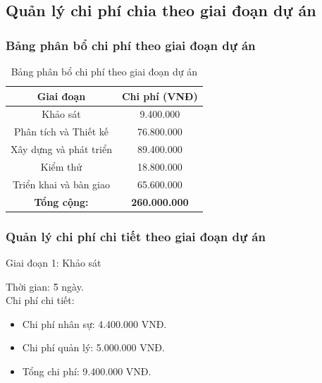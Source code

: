 \subsection{Quản lý chi phí chia theo giai đoạn dự án}
\subsubsection{Bảng phân bổ chi phí theo giai đoạn dự án}
\begin{table}[H]
    \centering
    \renewcommand{\arraystretch}{1.5} %
    \caption{Bảng phân bổ chi phí theo giai đoạn dự án}
    \begin{tabular}{|c|c|}
        \hline
        \textbf{Giai đoạn}                        & \textbf{Chi phí (VNĐ)} \\
        \hline
        Khảo sát                                  & 9.400.000              \\
        \hline
        Phân tích và Thiết kế                     & 76.800.000             \\
        \hline
        Xây dựng và phát triển                    & 89.400.000             \\
        \hline
        Kiểm thử                                  & 18.800.000             \\
        \hline
        Triển khai và bàn giao                    & 65.600.000             \\
        \hline
        \multicolumn{1}{|c|}{\textbf{Tổng cộng:}} & \textbf{260.000.000}   \\
        \hline
    \end{tabular}
\end{table}


\subsubsection{Quản lý chi phí chi tiết theo giai đoạn dự án}
\noindent Giai đoạn 1: Khảo sát
\begin{tabbing}
    Thời gian: \= 5 ngày. \\
    Chi phí chi tiết: 
\end{tabbing}
\begin{itemize}
    \item Chi phí nhân sự: 4.400.000 VNĐ.
    \item Chi phí quản lý: 5.000.000 VNĐ.
    \item Tổng chi phí: 9.400.000 VNĐ.
\end{itemize}

